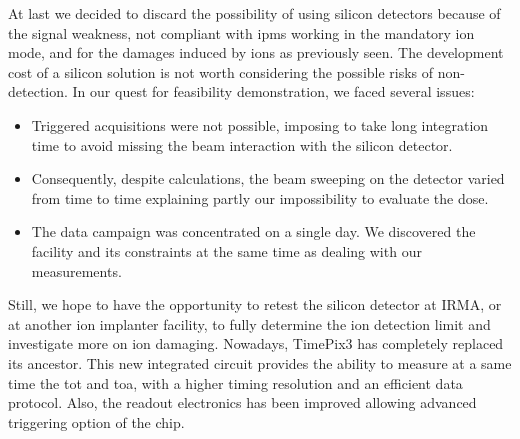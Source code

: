 \begin{refsection}
  At last we decided to discard the possibility of using silicon detectors because of the signal weakness, not compliant with \acrshort{ipm}s working in the mandatory ion mode, and for the damages induced by ions as previously seen. The development cost of a silicon solution is not worth considering the possible risks of non-detection.
  In our quest for feasibility demonstration, we faced several issues:
  \begin{itemize}
    \item Triggered acquisitions were not possible, imposing to take long integration time to avoid missing the beam interaction with the silicon detector.
    \item Consequently, despite calculations, the beam sweeping on the detector varied from time to time explaining partly our impossibility to evaluate the dose.
    \item The data campaign was concentrated on a single day. We discovered the facility and its constraints at the same time as dealing with our measurements.
  \end{itemize}

  Still, we hope to have the opportunity to retest the silicon detector at IRMA, or at another ion implanter facility, to fully determine the ion detection limit and investigate more on ion damaging.
  Nowadays, TimePix3 has completely replaced its ancestor. This new integrated circuit provides the ability to measure at a same time the \acrshort{tot} and \acrshort{toa}, with a higher timing resolution and an efficient data protocol. Also, the readout electronics has been improved allowing advanced triggering option of the chip.




\end{refsection}
